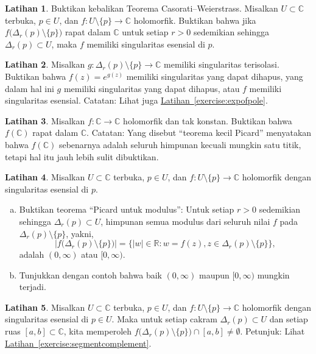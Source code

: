 \documentclass[12pt,openany]{book}
\newcommand{\sabs}[1]{\lvert {#1} \rvert}
\newcommand{\abs}[1]{\left\lvert {#1} \right\rvert}
\newcommand{\C}{{\mathbb{C}}}
\newcommand{\R}{{\mathbb{R}}}
\newcommand{\myquote}[1]{``#1''}
\theoremstyle{plain}
\theoremstyle{remark}
\theoremstyle{definition}
\newenvironment{exbox}{%
    \def\FrameCommand{\vrule width 1pt \relax\hspace{10pt}}%
    \MakeFramed{\advance\hsize-\width\FrameRestore}%
}{%
    \endMakeFramed
}
\newenvironment{exparts}{%
    \leavevmode\begin{enumerate}[a),noitemsep,topsep=0pt,parsep=0pt,partopsep=0pt]
}{%
    \end{enumerate}
}
\theoremstyle{exercise}
\newtheorem{exercise}{Latihan}[section]
\theoremstyle{example}
\newcommand{\exerciseref}[1]{\hyperref[#1]{Latihan~\ref*{#1}}}
\begin{document}
\begin{exbox}
\begin{exercise}
Buktikan kebalikan Teorema Casorati--Weierstrass.
Misalkan $U \subset \C$ terbuka, $p \in U$, dan
$f \colon U \setminus \{ p \} \to \C$
holomorfik.
Buktikan bahwa jika $f\bigl(\Delta_r(p) \setminus \{ p \} \bigr)$ rapat dalam $\C$
untuk setiap $r > 0$ sedemikian sehingga $\Delta_r(p) \subset U$,
maka $f$ memiliki singularitas esensial di $p$.
\end{exercise}

\begin{exercise}%
\label{exercise:singofexp}
Misalkan $g \colon \Delta_r(p) \setminus \{ p \} \to \C$
memiliki singularitas terisolasi. Buktikan bahwa $f(z) = e^{g(z)}$
memiliki singularitas yang dapat dihapus, yang dalam hal ini $g$
memiliki singularitas yang dapat dihapus, atau $f$ memiliki singularitas esensial.
Catatan: Lihat juga \exerciseref{exercise:expofpole}.
\end{exercise}

\begin{exercise}
Misalkan $f \colon \C \to \C$ holomorfik dan tak konstan.
Buktikan bahwa $f(\C)$ rapat dalam $\C$.
Catatan: Yang disebut \myquote{teorema kecil Picard} menyatakan bahwa $f(\C)$
sebenarnya adalah seluruh himpunan kecuali mungkin satu titik,
tetapi hal itu jauh lebih sulit dibuktikan.
\end{exercise}

\begin{exercise}
Misalkan $U \subset \C$ terbuka, $p \in U$, dan $f \colon U \setminus \{ p \} \to \C$
holomorfik dengan singularitas esensial di $p$.
\begin{exparts}
\item
Buktikan teorema \myquote{Picard untuk modulus}:
Untuk setiap $r > 0$ sedemikian sehingga
$\Delta_r(p) \subset U$, himpunan
semua modulus dari seluruh nilai $f$ pada $\Delta_r(p) \setminus \{ p \}$,
yakni,
\begin{equation*}
\abs{f\bigl(\Delta_r(p) \setminus \{ p \} \bigr)}
=
\bigl\{ \sabs{w} \in \R : w = f(z), z \in \Delta_r(p) \setminus \{ p \}
\bigr\},
\end{equation*}
adalah $(0,\infty)$ atau $[0,\infty)$.
\item
Tunjukkan dengan contoh bahwa baik $(0,\infty)$ maupun $[0,\infty)$ mungkin terjadi.
\end{exparts}
\end{exercise}

\begin{exercise}
Misalkan $U \subset \C$ terbuka, $p \in U$, dan $f \colon U \setminus \{ p \} \to \C$
holomorfik dengan
singularitas esensial di $p \in U$. Maka untuk setiap cakram
$\Delta_r(p) \subset U$ dan setiap ruas $[a,b] \subset
\C$, kita memperoleh
$f\bigl(\Delta_r(p) \setminus \{ p \} \bigr) \cap [a,b] \neq \emptyset$.
Petunjuk: Lihat
\exerciseref{exercise:segmentcomplement}.
\end{exercise}
\end{exbox}
\end{document}
